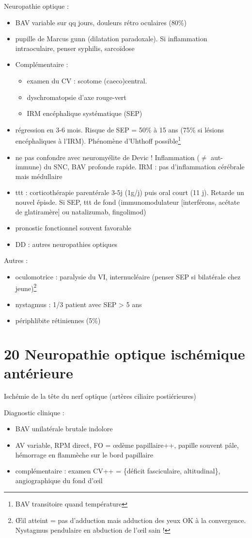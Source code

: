 \documentclass[11pt]{article}
\begin{document}
Neuropathie optique :
\begin{itemize}
\item BAV variable sur qq jours, douleurs rétro oculaires (80\%)
\item pupille de Marcus gunn (dilatation paradoxale). Si inflammation intraoculaire,
penser syphilis, sarcoïdose
\item Complémentaire :
\begin{itemize}
\item examen du CV : scotome (caeco)central.
\item dyschromatopsie d'axe rouge-vert
\item IRM encéphalique systématique (SEP)
\end{itemize}
\item régression en 3-6 mois. Risque de SEP = 50\% à 15 ans (75\% si lésions
encéphaliques à l'IRM). Phénomène d'Uhthoff possible\footnote{BAV transitoire quand température \inc}
\item ne pas confondre avec neuromyélite de Devic ! Inflammation (\(\ne\) aut-immune) du
SNC, BAV profonde rapide. IRM : pas d'inflammation cérébrale mais médullaire
\item ttt : corticothérapie  parentérale 3-5j (1g/j) puis oral court (11 j). Retarde
un nouvel épisde. Si SEP, ttt de fond (immunomodulateur [interférons, acétate
de glatiramère] ou natalizumab, fingolimod)
\item pronostic fonctionnel souvent favorable
\item DD : autres neuropathies optiques
\end{itemize}

Autres :
\begin{itemize}
\item oculomotrice : paralysie du VI, internucléaire (penser SEP si bilatérale chez jeune)\footnote{\OE{}il atteint = pas d'adduction mais adduction des yeux OK à la
convergence. Nystagmus pendulaire en abduction de l'\oe{}il sain !}
\item nystagmus : 1/3 patient avec SEP > 5 ans
\item périphlibite rétiniennes (5\%)
\end{itemize}
\section{20 Neuropathie optique ischémique antérieure}
\label{sec:org8620b9c}
Ischémie de la tête du nerf optique (artères ciliaire postiérieures)

Diagnostic clinique :
\begin{itemize}
\item BAV unilatérale brutale indolore
\item AV variable, \dec RPM direct, FO = \oe{}dème papillaire++, papille souvent
pâle, hémorrage en flammèche sur le bord papillaire
\item complémentaire : examen CV++ = \{déficit fasciculaire, altitudinal\},
angiographique du fond d'\oe{}il
\end{itemize}
\end{document}
